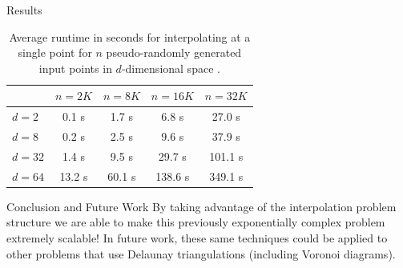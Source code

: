 \documentclass[xcolor=dvipsnames]{beamer}
\begin{document}
\begin{frame}{Results}
\begin{table}[htb]
\caption{Average runtime in seconds for interpolating at a single point
for $n$ pseudo-randomly generated input points in $d$-dimensional space .}
\label{tab:dimension}
\centering
\begin{tabular}{l|cccc}
  & $n=2K$ & $n=8K$ & $n=16K$ & $n=32K$\\
\hline
$d=2$ & 0.1 s & 1.7 s & 6.8 s & 27.0 s\\
$d=8$ & 0.2 s & 2.5 s & 9.6 s & 37.9 s\\
$d=32$ & 1.4 s & 9.5 s & 29.7 s & 101.1 s\\
$d=64$ & 13.2 s & 60.1 s & 138.6 s & 349.1 s\\
\end{tabular}
\end{table}
\end{frame}

\begin{frame}{Conclusion and Future Work}
\vfill
By taking advantage of the interpolation problem structure we are able to make 
this previously exponentially complex problem extremely scalable!
\vfill
In future work, these same techniques could be applied to other problems
that use Delaunay triangulations (including Voronoi diagrams).
\vfill
\end{frame}

\begin{frame}
\end{frame}
\end{document}
